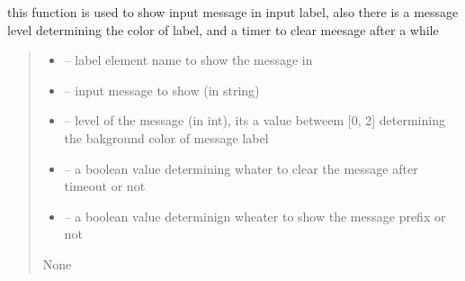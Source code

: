 \documentclass[letterpaper,10pt,english]{sphinxmanual}
\begin{document}
\begin{savenotes}
\begin{fulllineitems}
\begin{savenotes}\begin{fulllineitems}
\label{\detokenize{setting/setting_UI:oxin.setting_UI.UI_main_window.show_mesagges}}
\pysigstartsignatures
{}
\pysigstopsignatures
\sphinxAtStartPar
this function is used to show input message in input label, also there is a message level determining the color of label, and a timer to clear meesage after a while
\begin{quote}\begin{description}
\begin{itemize}
\item {} 
\sphinxAtStartPar
{} – label element name to show the message in

\item {} 
\sphinxAtStartPar
{} – input message to show (in string)

\item {} 
\sphinxAtStartPar
{} – level of the message (in int), its a value betweem {[}0, 2{]} determining the bakground color of message label

\item {} 
\sphinxAtStartPar
{} – a boolean value determining whater to clear the message after timeout or not

\item {} 
\sphinxAtStartPar
{} – a boolean value determinign wheater to show the message prefix or not

\end{itemize}

\sphinxAtStartPar
None

\end{description}\end{quote}

\end{fulllineitems}\end{savenotes}


\end{fulllineitems}
\end{savenotes}
\end{document}
